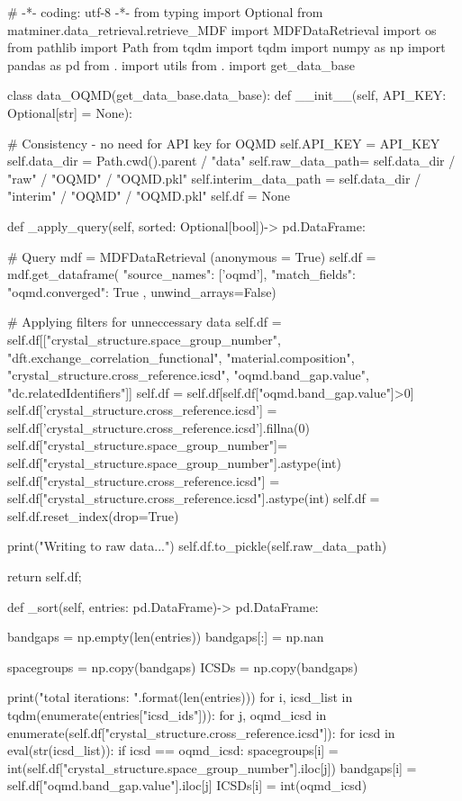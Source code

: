 # -*- coding: utf-8 -*-
from typing import Optional
from matminer.data_retrieval.retrieve_MDF import MDFDataRetrieval
import os
from pathlib import Path
from tqdm import tqdm
import numpy as np
import pandas as pd
from . import utils
from . import get_data_base

class data_OQMD(get_data_base.data_base):
    def __init__(self, API_KEY: Optional[str] = None):

        # Consistency - no need for API key for OQMD
        self.API_KEY = API_KEY
        self.data_dir = Path.cwd().parent / "data"
        self.raw_data_path= self.data_dir / "raw" / "OQMD" / "OQMD.pkl"
        self.interim_data_path = self.data_dir / "interim" / "OQMD" / "OQMD.pkl"
        self.df = None

    def _apply_query(self, sorted: Optional[bool])-> pd.DataFrame:

        # Query
        mdf = MDFDataRetrieval (anonymous = True)
        self.df = mdf.get_dataframe({
                    "source_names": ['oqmd'],
                    "match_fields": {"oqmd.converged": True}                    },
                    unwind_arrays=False)

        # Applying filters for unneccessary data
        self.df = self.df[["crystal_structure.space_group_number", "dft.exchange_correlation_functional", "material.composition", "crystal_structure.cross_reference.icsd", "oqmd.band_gap.value", "dc.relatedIdentifiers"]]
        self.df = self.df[self.df["oqmd.band_gap.value"]>0]
        self.df['crystal_structure.cross_reference.icsd'] = self.df['crystal_structure.cross_reference.icsd'].fillna(0)
        self.df["crystal_structure.space_group_number"]= self.df["crystal_structure.space_group_number"].astype(int)
        self.df["crystal_structure.cross_reference.icsd"] = self.df["crystal_structure.cross_reference.icsd"].astype(int)
        self.df = self.df.reset_index(drop=True)

        print("Writing to raw data...")
        self.df.to_pickle(self.raw_data_path)

        return self.df;

    def _sort(self, entries: pd.DataFrame)-> pd.DataFrame:

        bandgaps = np.empty(len(entries))
        bandgaps[:] = np.nan

        spacegroups = np.copy(bandgaps)
        ICSDs       = np.copy(bandgaps)

        print("total iterations: {}".format(len(entries)))
        for i, icsd_list in tqdm(enumerate(entries["icsd_ids"])):
            for j, oqmd_icsd in enumerate(self.df["crystal_structure.cross_reference.icsd"]):
                for icsd in eval(str(icsd_list)):
                    if icsd == oqmd_icsd:
                        spacegroups[i] = int(self.df["crystal_structure.space_group_number"].iloc[j])
                        bandgaps[i] = self.df["oqmd.band_gap.value"].iloc[j]
                        ICSDs[i] = int(oqmd_icsd)

